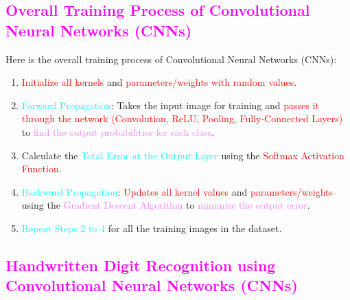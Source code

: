 \documentclass{book}
\begin{document}
\textcolor{magenta}{\section{\textbf{Overall Training Process of Convolutional Neural Networks (CNNs)}}}
Here is the overall training process of Convolutional Neural Networks (CNNs):
\begin{enumerate}
    \item \textcolor{red}{Initialize all kernels} and \textcolor{red}{parameters/weights with random values}.
    \item \textcolor{cyan}{Forward Propagation}: Takes the input image for training and \textcolor{red}{passes it through the network (Convolution, ReLU, Pooling, Fully-Connected Layers)} to \textcolor{violet}{find the output probabilities for each class}.
    \item Calculate the \textcolor{cyan}{Total Error at the Output Layer} using the \textcolor{red}{Softmax Activation Function}.
    \item \textcolor{cyan}{Backward Propagation}: \textcolor{red}{Updates all kernel values} and \textcolor{red}{parameters/weights} using the \textcolor{violet}{Gradient Descent Algorithm} to \textcolor{violet}{minimize the output error}.
    \item \textcolor{cyan}{Repeat Steps 2 to 4} for all the training images in the dataset.
\end{enumerate}
\newpage
\textcolor{magenta}{\section{\textbf{Handwritten Digit Recognition using Convolutional Neural Networks (CNNs)}}}
\end{document}
